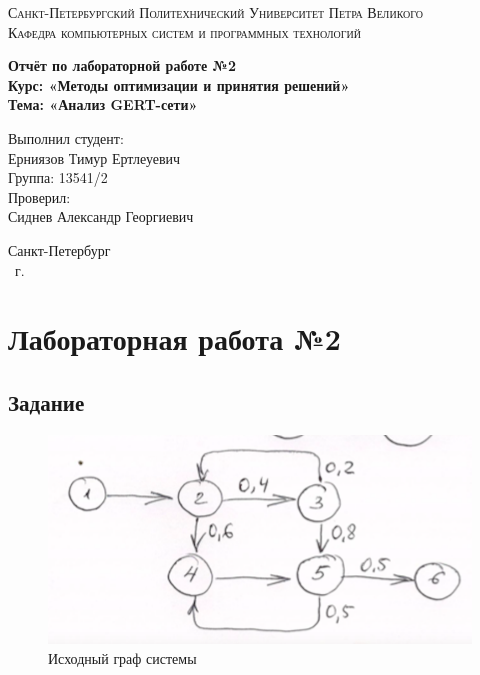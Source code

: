 \documentclass[14pt,a4paper,report]{report}
\begin{document}
\def\contentsname{Содержание}

\begin{titlepage}
	\begin{center}
		\textsc{Санкт-Петербургский Политехнический 
			Университет Петра Великого\\[5mm]
			Кафедра компьютерных систем и программных технологий}
		
		\vfill
		
		\textbf{Отчёт по лабораторной работе №2\\[3mm]
			Курс: «Методы оптимизации и принятия решений»\\[3mm]
			Тема: «Анализ GERT-сети»\\[35mm]
			}
	\end{center}
	
	\hfill
	\begin{minipage}{.5\textwidth}
		Выполнил студент:\\[2mm] 
		Ерниязов Тимур Ертлеуевич\\
		Группа: 13541/2\\[5mm]
		
		Проверил:\\[2mm] 
		Сиднев Александр Георгиевич
	\end{minipage}
	\vfill
	\begin{center}
		Санкт-Петербург\\ \the\year\ г.
	\end{center}
\end{titlepage}

\tableofcontents
\clearpage

\chapter{Лабораторная работа №2}

\section{Задание}

\begin{figure}[h!]
	\centering
	\includegraphics[scale = 0.55]{images/0.png}
	\caption{Исходный граф системы}
	\label{image:0}
\end{figure}
\end{document}
